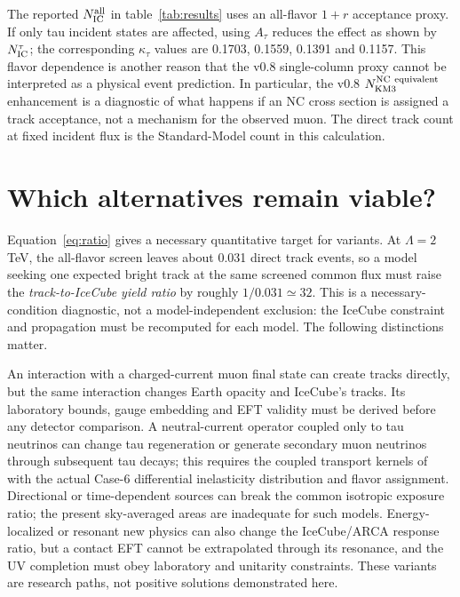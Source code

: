 \documentclass[11pt,a4paper]{article}
\begin{document}
The reported $N_{\rm IC}^{\rm all}$ in table~\ref{tab:results} uses an
all-flavor $1+r$ acceptance proxy.  If only tau incident states are affected,
using $A_\tau$ reduces the effect as shown by $N_{\rm IC}^{\tau}$; the
corresponding $\kappa_\tau$ values are 0.1703, 0.1559, 0.1391 and 0.1157.
This flavor dependence is another reason that the v0.8 single-column proxy
cannot be interpreted as a physical event prediction.  In particular, the
v0.8 $N_{\rm KM3}^{\rm NC\ equivalent}$ enhancement is a diagnostic of
what happens if an NC cross section is assigned a track acceptance, not a
mechanism for the observed muon.  The direct track count at fixed incident
flux is the Standard-Model count in this calculation.

\section{Which alternatives remain viable?}
Equation~\eqref{eq:ratio} gives a necessary quantitative target for variants.
At $\Lambda=2$ TeV, the all-flavor screen leaves about 0.031 direct track
events, so a model seeking one expected bright track at the same screened
common flux must raise the \emph{track-to-IceCube yield ratio} by roughly
$1/0.031\simeq32$.  This is a necessary-condition diagnostic, not a
model-independent exclusion: the IceCube constraint and propagation must
be recomputed for each model.  The following distinctions matter.

An interaction with a charged-current muon final state can create tracks
directly, but the same interaction changes Earth opacity and IceCube's
tracks.  Its laboratory bounds, gauge embedding and EFT validity must be
derived before any detector comparison.  A neutral-current operator
coupled only to tau neutrinos can change tau regeneration or generate
secondary muon neutrinos through subsequent tau decays; this requires the
coupled transport kernels of \cite{Rakshit:2006,Dutta:2002} with the actual
Case-6 differential inelasticity distribution and flavor assignment.
Directional or time-dependent sources can break the common isotropic
exposure ratio; the present sky-averaged areas are inadequate for such
models.  Energy-localized or resonant new physics can also change the
IceCube/ARCA response ratio, but a contact EFT cannot be extrapolated
through its resonance, and the UV completion must obey laboratory and
unitarity constraints.  These variants are research paths, not positive
solutions demonstrated here.
\end{document}
